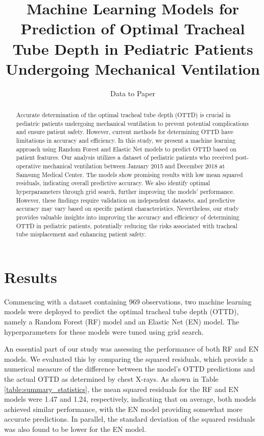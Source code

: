\documentclass[11pt]{article}
\title{Machine Learning Models for Prediction of Optimal Tracheal Tube Depth in Pediatric Patients Undergoing Mechanical Ventilation}
\author{Data to Paper}
\begin{document}
\maketitle
\begin{abstract}
Accurate determination of the optimal tracheal tube depth (OTTD) is crucial in pediatric patients undergoing mechanical ventilation to prevent potential complications and ensure patient safety. However, current methods for determining OTTD have limitations in accuracy and efficiency. In this study, we present a machine learning approach using Random Forest and Elastic Net models to predict OTTD based on patient features. Our analysis utilizes a dataset of pediatric patients who received post-operative mechanical ventilation between January 2015 and December 2018 at Samsung Medical Center. The models show promising results with low mean squared residuals, indicating overall predictive accuracy. We also identify optimal hyperparameters through grid search, further improving the models' performance. However, these findings require validation on independent datasets, and predictive accuracy may vary based on specific patient characteristics. Nevertheless, our study provides valuable insights into improving the accuracy and efficiency of determining OTTD in pediatric patients, potentially reducing the risks associated with tracheal tube misplacement and enhancing patient safety.
\end{abstract}
\section*{Results}
Commencing with a dataset containing 969 observations, two machine learning models were deployed to predict the optimal tracheal tube depth (OTTD), namely a Random Forest (RF) model and an Elastic Net (EN) model. The hyperparameters for these models were tuned using grid search.

An essential part of our study was assessing the performance of both RF and EN models. We evaluated this by comparing the squared residuals, which provide a numerical measure of the difference between the model's OTTD predictions and the actual OTTD as determined by chest X-rays. As shown in Table {}\ref{table:summary_statistics}, the mean squared residuals for the RF and EN models were 1.47 and 1.24, respectively, indicating that on average, both models achieved similar performance, with the EN model providing somewhat more accurate predictions. In parallel, the standard deviation of the squared residuals was also found to be lower for the EN model.
\end{document}
